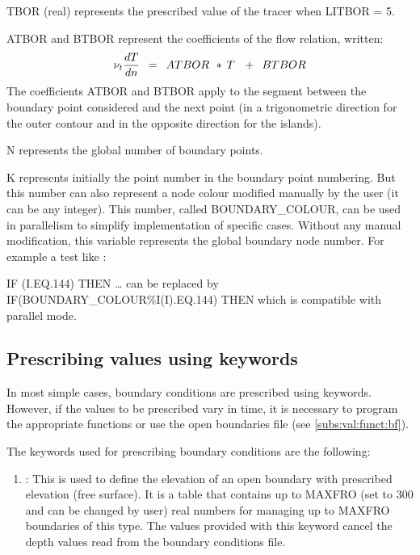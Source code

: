  TBOR (real) represents the prescribed value of the tracer when LITBOR = 5.

 ATBOR and BTBOR represent the coefficients of the flow relation, written:
\[\nu _{t} \frac{dT}{dn} {\kern 1pt} {\kern 1pt} {\kern 1pt} {\kern 1pt} {\kern 1pt} ={\kern 1pt} {\kern 1pt} {\kern 1pt} {\kern 1pt} {\kern 1pt} ATBOR{\kern 1pt} {\kern 1pt} {\kern 1pt} {\kern 1pt} *{\kern 1pt} {\kern 1pt} T{\kern 1pt} {\kern 1pt} {\kern 1pt} {\kern 1pt} {\kern 1pt} {\kern 1pt} {\kern 1pt} +{\kern 1pt} {\kern 1pt} {\kern 1pt} {\kern 1pt} {\kern 1pt} BTBOR\]
The coefficients ATBOR and BTBOR apply to the segment between the boundary point considered and the next point (in a trigonometric direction for the outer contour and in the opposite direction for the islands).

 N represents the global number of boundary points.

 K represents initially the point number in the boundary point numbering. But this number can also represent a node colour modified manually by the user (it can be any integer). This number, called BOUNDARY\_COLOUR, can be used in parallelism to simplify implementation of specific cases. Without any manual modification, this variable represents the global boundary node number. For example a test like :

 IF (I.EQ.144) THEN {\dots} can be replaced by IF(BOUNDARY\_COLOUR\%I(I).EQ.144) THEN which is compatible with parallel mode.


\subsection{ Prescribing values using keywords}
\label{subs:val:key}
 In most simple cases, boundary conditions are prescribed using keywords. However, if the values to be prescribed vary in time, it is necessary to program the appropriate functions or use the open boundaries file (see \ref{subs:val:funct:bf}).

 The keywords used for prescribing boundary conditions are the following:

\begin{enumerate}
\item  {}: This is used to define the elevation of an open boundary with prescribed elevation (free surface). It is a table that contains up to MAXFRO (set to 300 and can be changed by user) real numbers for managing up to MAXFRO boundaries of this type. The values provided with this keyword cancel the depth values read from the boundary conditions file.
\end{enumerate}

